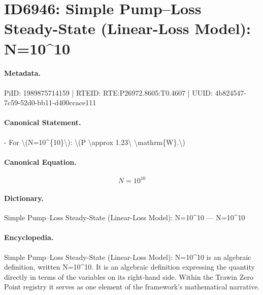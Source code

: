 \section*{ID6946: Simple Pump–Loss Steady-State (Linear-Loss Model): N=10\textasciicircum{}10}
\paragraph{Metadata.}
PiID: 1989875714159 | RTEID: RTE:P26972.8605:T0.4607 | UUID: 4b824547-7c59-52d0-bb11-d400ccace111

\paragraph{Canonical Statement.}
- For \textbackslash{}(N=10\textasciicircum{}\{10\}\textbackslash{}): \textbackslash{}(P \textbackslash{}approx 1.23\textbackslash{} \textbackslash{}mathrm\{W\}.\textbackslash{})

\paragraph{Canonical Equation.}
\[
N=10^{10}
\]

\paragraph{Dictionary.}
Simple Pump–Loss Steady-State (Linear-Loss Model): N=10\textasciicircum{}10 — N=10\textasciicircum{}10

\paragraph{Encyclopedia.}
Simple Pump–Loss Steady-State (Linear-Loss Model): N=10\textasciicircum{}10 is an algebraic definition, written N=10\textasciicircum{}10. It is an algebraic definition expressing the quantity directly in terms of the variables on its right-hand side. Within the Trawin Zero Point registry it serves as one element of the framework's mathematical narrative.
